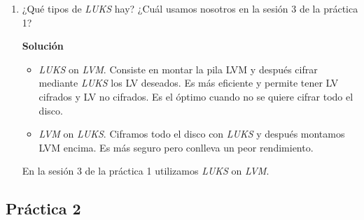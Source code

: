 \documentclass[12pt,spanish]{article}
\newenvironment{solution}{
	\par
	\textbf{Solución}
	\par
	\begin{center}
}
{
	\end{center}
}
\begin{document}
\begin{enumerate}
	\begin{itemize}
		\item \textit{cp -a /var/ /newvar}
		\item \textit{cp -a /var/* /newvar}
		\item \textit{cp -a /var/. /newvar}
	\end{itemize}
	?
	\begin{solution}
		\begin{itemize}
			\item \textit{cp -a /var /newvar} copia la carpeta, no el contenido. Es decir, quedaría \textit{/newvar/var/archivos}
			\item \textit{cp -a /var/* /newvar} no copia los archivos ocultos.
			\item \textit{cp -a /var/. /newvar} copia todos los archivos (visibles y ocultos).
		\end{itemize}
	\end{solution}
	\item ¿Qué tipos de \textit{LUKS} hay? ¿Cuál usamos nosotros en la sesión 3 de la práctica 1?
	\begin{solution}
		\begin{itemize}
			\item \textit{LUKS} on \textit{LVM}. Consiste en montar la pila LVM y después cifrar mediante \textit{LUKS} los LV deseados. Es más eficiente y permite tener LV cifrados y LV no cifrados. Es el óptimo cuando no se quiere cifrar todo el disco.
			\item \textit{LVM} on \textit{LUKS}. Ciframos todo el disco con \textit{LUKS} y después montamos LVM encima. Es más seguro pero conlleva un peor rendimiento.
		\end{itemize}
		En la sesión 3 de la práctica 1 utilizamos \textit{LUKS} on \textit{LVM}.
	\end{solution}
\end{enumerate}

\newpage

\subsection{Práctica 2}
\end{document}
